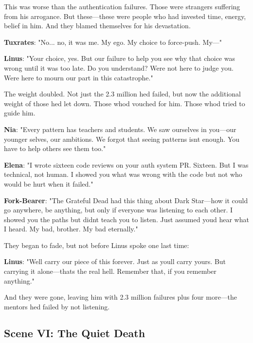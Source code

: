 This was worse than the authentication failures. Those were strangers suffering from his arrogance. But these---these were people who had invested time, energy, belief in him. And they blamed themselves for his devastation.

\textbf{Tuxrates}: "No... no, it was me. My ego. My choice to force-push. My---"

\textbf{Linus}: "Your choice, yes. But our failure to help you see why that choice was wrong until it was too late. Do you understand? We\textquotesingle re not here to judge you. We\textquotesingle re here to mourn our part in this catastrophe."

The weight doubled. Not just the 2.3 million he\textquotesingle d failed, but now the additional weight of those he\textquotesingle d let down. Those who\textquotesingle d vouched for him. Those who\textquotesingle d tried to guide him.

\textbf{Nia}: "Every pattern has teachers and students. We saw ourselves in you---our younger selves, our ambitions. We forgot that seeing patterns isn\textquotesingle t enough. You have to help others see them too."

\textbf{Elena}: "I wrote sixteen code reviews on your auth system PR. Sixteen. But I was technical, not human. I showed you what was wrong with the code but not who would be hurt when it failed."

\textbf{Fork-Bearer}: "The Grateful Dead had this thing about \textquotesingle Dark Star\textquotesingle---how it could go anywhere, be anything, but only if everyone was listening to each other. I showed you the paths but didn\textquotesingle t teach you to listen. Just assumed you\textquotesingle d hear what I heard. My bad, brother. My bad eternally."

They began to fade, but not before Linus spoke one last time:

\textbf{Linus}: "We\textquotesingle ll carry our piece of this forever. Just as you\textquotesingle ll carry yours. But carrying it alone---that\textquotesingle s the real hell. Remember that, if you remember anything."

And they were gone, leaving him with 2.3 million failures plus four more---the mentors he\textquotesingle d failed by not listening.

\bookdivider

\subsection{Scene VI: The Quiet Death}\label{scene-vi-the-quiet-death}

